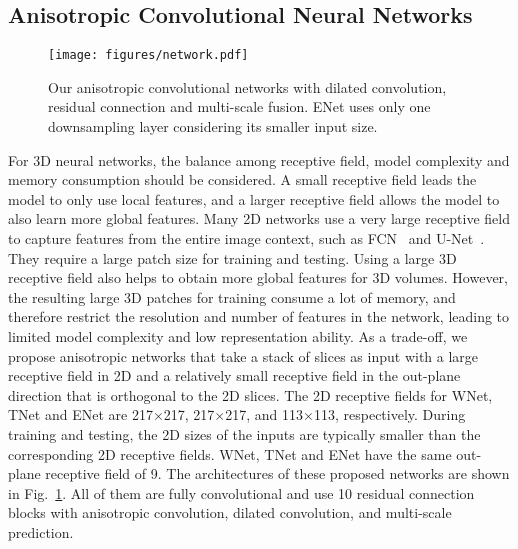 \documentclass[a4paper,orivec,runningheads]{llncs}
\begin{document}
\subsection{Anisotropic Convolutional Neural Networks}
\begin{figure}[t]
	\centering
	\texttt{[image: figures/network.pdf]}
	\caption[anisotropic network]{
		Our anisotropic convolutional networks with dilated convolution, residual connection and multi-scale fusion. ENet uses only one downsampling layer considering its smaller input size.
	}
	\label{fig:network}
\end{figure}
For 3D neural networks, the balance among receptive field, model complexity and memory consumption should be considered. A small receptive field leads the model to only use local features, and a larger receptive field allows the model to also learn more global features. Many 2D networks use a very large receptive field to capture features from the entire image context, such as FCN~\cite{Long2014} and U-Net~\cite{Hefny2015a}. They require a large patch size for training and testing. Using a large 3D receptive field also helps to obtain more global features for 3D volumes. However, the resulting large 3D patches for training consume a lot of memory, and therefore restrict the resolution and number of features in the network, leading to limited model complexity and low representation ability. As a trade-off, we propose anisotropic networks that take a stack of slices as input with a large receptive field in 2D and a relatively small receptive field in the out-plane direction that is orthogonal to the 2D slices. The 2D receptive fields for WNet, TNet and ENet are 217$\times$217, 217$\times$217, and 113$\times$113, respectively. During training and testing, the 2D sizes of the inputs are typically smaller than the corresponding 2D receptive fields. WNet, TNet and ENet have the same out-plane receptive field of 9. The architectures of these proposed networks are shown in Fig.~\ref{fig:network}. All of them are fully convolutional and use 10 residual connection blocks with anisotropic convolution, dilated convolution, and multi-scale prediction.
\end{document}
